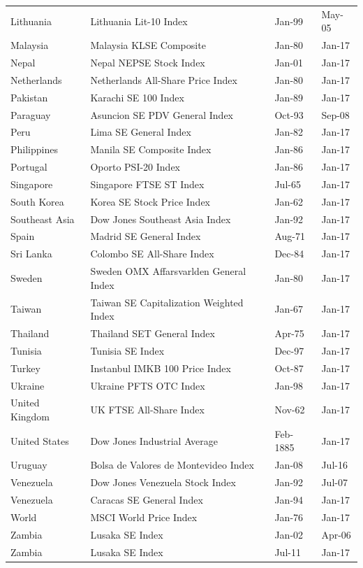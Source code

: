 \documentclass[12pt,final,fleqn]{article}
\theoremstyle{plain}
\begin{document}
\begin{table}[H]
\begin{center}
\begin{threeparttable}
\begin{tabular*}{\textwidth}{l@{\extracolsep{\fill}}lll}
Lithuania & Lithuania Lit-10 Index & Jan-99 & May-05\\
Malaysia & Malaysia KLSE Composite & Jan-80 & Jan-17\\
Nepal & Nepal NEPSE Stock Index & Jan-01 & Jan-17\\
Netherlands & Netherlands All-Share Price Index & Jan-80 & Jan-17\\
Pakistan & Karachi SE 100 Index & Jan-89 & Jan-17\\
Paraguay & Asuncion SE PDV General Index & Oct-93 & Sep-08\\
Peru & Lima SE General Index & Jan-82 & Jan-17\\
Philippines & Manila SE Composite Index & Jan-86 & Jan-17\\
Portugal & Oporto PSI-20 Index & Jan-86 & Jan-17\\
Singapore & Singapore FTSE ST Index & Jul-65 & Jan-17\\
South Korea & Korea SE Stock Price Index  & Jan-62 & Jan-17\\
Southeast Asia & Dow Jones Southeast Asia Index & Jan-92 & Jan-17\\
Spain & Madrid SE General Index & Aug-71 & Jan-17\\
Sri Lanka & Colombo SE All-Share Index & Dec-84 & Jan-17\\
Sweden & Sweden OMX Affarsvarlden General Index & Jan-80 & Jan-17\\
Taiwan & Taiwan SE Capitalization Weighted Index & Jan-67 & Jan-17\\
Thailand & Thailand SET General Index & Apr-75 & Jan-17\\
Tunisia & Tunisia SE Index & Dec-97 & Jan-17\\
Turkey & Instanbul IMKB 100 Price Index & Oct-87 & Jan-17\\
Ukraine & Ukraine PFTS OTC Index & Jan-98 & Jan-17\\
United Kingdom & UK FTSE All-Share Index & Nov-62 & Jan-17\\
United States & Dow Jones Industrial Average & Feb-1885 & Jan-17\\
Uruguay & Bolsa de Valores de Montevideo Index & Jan-08 & Jul-16\\
Venezuela & Dow Jones Venezuela Stock Index & Jan-92 & Jul-07\\
Venezuela & Caracas SE General Index & Jan-94 & Jan-17\\
World & MSCI World Price Index & Jan-76 & Jan-17\\
Zambia & Lusaka SE Index & Jan-02 & Apr-06\\
Zambia & Lusaka SE Index & Jul-11 & Jan-17\\
   \hline
   \hline
\end{tabular*}
\end{threeparttable}
\end{center}
\end{table}
\end{document}
